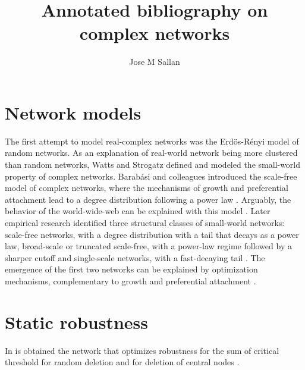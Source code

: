 \documentclass[12pt]{article}
\title{Annotated bibliography on complex networks}
\author{Jose M Sallan}
\date{}
\begin{document}
\maketitle

\section{Network models}

The first attempt to model real-complex networks was the Erdös-R\'enyi model of random networks. As an explanation of real-world network being more clustered than random networks, Watts and Strogatz \cite{Watts1998a} defined and modeled the small-world property of complex networks. Barab\'asi and colleagues introduced the scale-free model of complex networks, where the mechanisms of growth and preferential attachment lead to a degree distribution following a power law \cite{BarabasiA.-L;Albert1999}. Arguably, the behavior of the world-wide-web can be explained with this model \cite{Barabasi2000}. Later empirical research identified three structural classes of small-world networks: scale-free networks, with a degree distribution with a tail that decays as a power law, broad-scale or truncated scale-free, with a power-law regime followed by a  sharper cutoff and single-scale networks, with a  fast-decaying tail \cite{Amaral2000}. The emergence of the first two networks can be explained by optimization mechanisms, complementary to growth and preferential attachment \cite{Cancho2003}.

\section{Static robustness}

In \cite{Paul2005} is obtained the network that optimizes robustness for the sum of critical threshold for random deletion \cite{Cohen2000a} and for deletion of central nodes \cite{Cohen2001a}.

\nocite{*}



\end{document}
